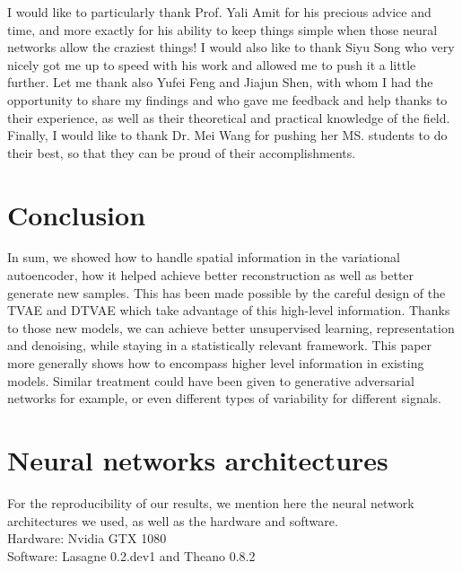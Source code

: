 \documentclass[letterpaper, twoside]{article}
\begin{document}
  I would like to particularly thank Prof. Yali Amit for his precious advice and time, and more exactly for his ability to keep things simple when those neural networks allow the craziest things! I would also like to thank Siyu Song who very nicely got me up to speed with his work and allowed me to push it a little further. Let me thank also Yufei Feng and Jiajun Shen, with whom I had the opportunity to share my findings and who gave me feedback and help thanks to their experience, as well as their theoretical and practical knowledge of the field. Finally, I would like to thank Dr. Mei Wang for pushing her MS. students to do their best, so that they can be proud of their accomplishments.

\section*{Conclusion}

  In sum, we showed how to handle spatial information in the variational autoencoder, how it helped achieve better reconstruction as well as better generate new samples. This has been made possible by the careful design of the TVAE and DTVAE which take advantage of this high-level information. Thanks to those new models, we can achieve better unsupervised learning, representation and denoising, while staying in a statistically relevant framework. This paper more generally shows how to encompass higher level information in existing models. Similar treatment could have been given to generative adversarial networks \cite{Goodfellow.gan} for example, or even different types of variability for different signals.




\newpage
\appendix
\section{Neural networks architectures}

For the reproducibility of our results, we mention here the neural network architectures we used, as well as the hardware and software. \\
Hardware: Nvidia GTX 1080\\
Software: Lasagne 0.2.dev1 and Theano 0.8.2\\
\end{document}
